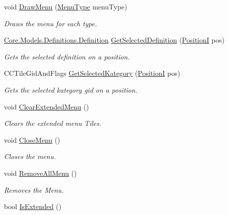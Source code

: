 \begin{DoxyCompactItemize}
void \hyperlink{classClient_1_1Common_1_1Views_1_1MenuView_a6fce28a445624cfdc1f9b045411c604f}{Draw\+Menu} (\hyperlink{classClient_1_1Common_1_1Views_1_1MenuView_a63db164d71105de8543e3992db8c9a1c}{Menu\+Type} menu\+Type)
\begin{DoxyCompactList}\small\item\em Draws the menu for each type. \end{DoxyCompactList}\item 
\hyperlink{classCore_1_1Models_1_1Definitions_1_1Definition}{Core.\+Models.\+Definitions.\+Definition} \hyperlink{classClient_1_1Common_1_1Views_1_1MenuView_a5b45615926b800171d593f279a01e283}{Get\+Selected\+Definition} (\hyperlink{classCore_1_1Models_1_1PositionI}{Position\+I} pos)
\begin{DoxyCompactList}\small\item\em Gets the selected definition on a position. \end{DoxyCompactList}\item 
C\+C\+Tile\+Gid\+And\+Flags \hyperlink{classClient_1_1Common_1_1Views_1_1MenuView_ae297dd1b9a97ab6936f51b92cc5042c2}{Get\+Selected\+Kategory} (\hyperlink{classCore_1_1Models_1_1PositionI}{Position\+I} pos)
\begin{DoxyCompactList}\small\item\em Gets the selected kategory gid on a position. \end{DoxyCompactList}\item 
void \hyperlink{classClient_1_1Common_1_1Views_1_1MenuView_aca76b1123fb7d025ca07ab120849008b}{Clear\+Extended\+Menu} ()
\begin{DoxyCompactList}\small\item\em Clears the extended menu Tiles. \end{DoxyCompactList}\item 
void \hyperlink{classClient_1_1Common_1_1Views_1_1MenuView_abd8d48d776f40caf15251786866331bc}{Close\+Menu} ()
\begin{DoxyCompactList}\small\item\em Closes the menu. \end{DoxyCompactList}\item 
void \hyperlink{classClient_1_1Common_1_1Views_1_1MenuView_a80382e5069b92bf7adcae28fa0b8afa0}{Remove\+All\+Menu} ()
\begin{DoxyCompactList}\small\item\em Removes the Menu. \end{DoxyCompactList}\item 
bool \hyperlink{classClient_1_1Common_1_1Views_1_1MenuView_a23e2f8cb68829a8d2bfaeff729008d2f}{Is\+Extended} ()

\end{DoxyCompactItemize}
